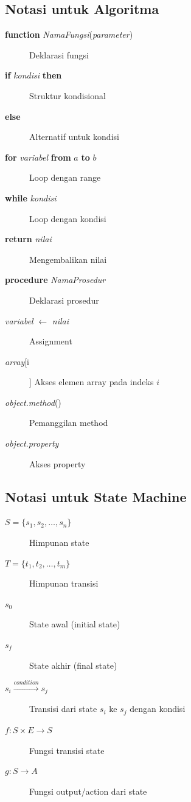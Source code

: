 \subsection*{Notasi untuk Algoritma}

\begin{description}
    \item[\textbf{function} \textit{NamaFungsi}(\textit{parameter})] Deklarasi fungsi
    \item[\textbf{if} \textit{kondisi} \textbf{then}] Struktur kondisional
    \item[\textbf{else}] Alternatif untuk kondisi
    \item[\textbf{for} \textit{variabel} \textbf{from} $a$ \textbf{to} $b$] Loop dengan range
    \item[\textbf{while} \textit{kondisi}] Loop dengan kondisi
    \item[\textbf{return} \textit{nilai}] Mengembalikan nilai
    \item[\textbf{procedure} \textit{NamaProsedur}] Deklarasi prosedur
    \item[\textit{variabel} $\leftarrow$ \textit{nilai}] Assignment
    \item[\textit{array}[i]] Akses elemen array pada indeks $i$
    \item[\textit{object}.\textit{method}()] Pemanggilan method
    \item[\textit{object}.\textit{property}] Akses property
\end{description}

\subsection*{Notasi untuk State Machine}

\begin{description}
    \item[$S = \{s_1, s_2, \ldots, s_n\}$] Himpunan state
    \item[$T = \{t_1, t_2, \ldots, t_m\}$] Himpunan transisi
    \item[$s_0$] State awal (initial state)
    \item[$s_f$] State akhir (final state)
    \item[$s_i \xrightarrow{condition} s_j$] Transisi dari state $s_i$ ke $s_j$ dengan kondisi
    \item[$f: S \times E \rightarrow S$] Fungsi transisi state
    \item[$g: S \rightarrow A$] Fungsi output/action dari state
\end{description}

